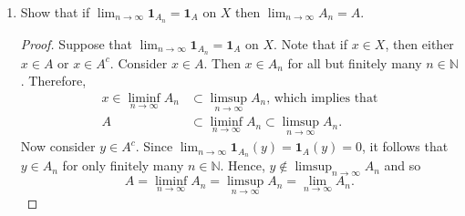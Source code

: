 \documentclass[12pt]{article}
\newcommand{\N}{\mathbb{N}}
\newenvironment{problem}[2][Problem]{\begin{trivlist}
		\item[\hskip \labelsep {\bfseries #1}\hskip \labelsep {\bfseries #2.}]}{\end{trivlist}}
\begin{document}
\begin{problem}{1.6}
\begin{enumerate}[label= \textbf{(\alph*)}]
		\item Show that if $\lim_{n\to \infty} \textbf{1}_{A_{n}} = \textbf{1}_{A}$ on $X$ then $\lim_{n \to \infty} A_{n} = A$.
		\begin{proof}
			Suppose that $\lim_{n \to \infty} \textbf{1}_{A_{n}} = \textbf{1}_{A}$ on $X$. Note that if $x\in X$, then either $x\in A$ or $x\in A^{c}$. Consider $x\in A$. Then $x\in A_{n}$  for all but finitely many $n\in \N$. Therefore, 
			\begin{align*}
				x\in \liminf_{n\to \infty} A_{n} &\subset \limsup_{n\to \infty} A_{n} \text{, which implies that}\\
				A&\subset \liminf_{n\to \infty} A_{n} \subset \limsup_{n\to \infty} A_{n}.
			\end{align*}
		Now consider $y\in A^{c}$. Since $\lim_{n \to \infty} \textbf{1}_{A_{n}} (y) = \textbf{1}_{A} (y) = 0$, it follows that $y\in A_{n}$ for only finitely many $n\in \N$. Hence, $y \not \in \limsup_{n\to \infty} A_{n}$ and so
		\begin{equation*}
			A= \liminf_{n \to \infty} A_{n} = \limsup_{n\to \infty} A_{n} = \lim_{n \to \infty} A_{n}.
		\end{equation*}
		\end{proof}
	\end{enumerate}
\end{problem}
\end{document}
